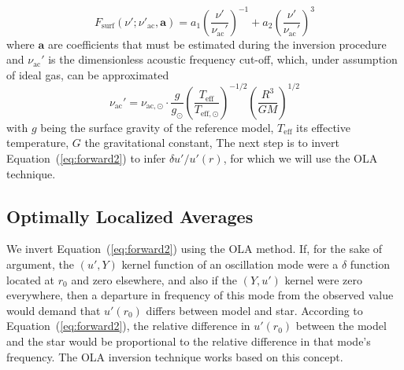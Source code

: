 \begin{equation}
    F_{\text{surf}}(\nu'; \nu'_{\text{ac}}, \mathbf a) = 
           a_1 \left( \frac{\nu'}{\nu_{\text{ac}}'} \right)^{-1} 
         + a_2 \left( \frac{\nu'}{\nu_{\text{ac}}'} \right)^3 
\end{equation}
where $\mathbf a$ are coefficients that must be estimated during the inversion procedure and $\nu_{\text{ac}}'$ is the dimensionless acoustic frequency cut-off, which, under assumption of ideal gas, can be approximated  %
\begin{equation}
    \nu_{\text{ac}}' 
    = 
    \nu_{\text{ac},\odot} \cdot
    \frac{g}{g_{\odot}} 
    \left( 
        \frac{T_{\text{eff}}}{T_{\text{eff},\odot}} 
    \right)^{-1/2} 
    \left( 
        \frac{R^3}{G M} 
    \right)^{1/2}
\end{equation}
with $g$ being the surface gravity of the reference model, $T_{\text{eff}}$ its effective temperature, $G$ the gravitational constant,  
The next step is to invert Equation~(\ref{eq:forward2}) to infer ${\delta u'/u'(r)}$, for which we will use the OLA technique. 

{}
\subsection{Optimally Localized Averages}
We invert Equation~(\ref{eq:forward2}) using the OLA method.
If, for the sake of argument, the ${(u',Y)}$ kernel function of an oscillation mode were a $\delta$ function located at $r_0$ and zero elsewhere, and also if the ${(Y,u')}$ kernel were zero everywhere, then a departure in frequency of this mode from the observed value would demand that ${u'(r_0)}$ differs between model and star. 
According to Equation~(\ref{eq:forward2}), the relative difference in ${u'(r_0)}$ between the model and the star would be proportional to the relative difference in that mode's frequency. The OLA inversion technique works based on this concept. 

